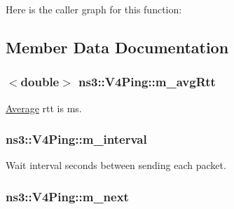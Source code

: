 Here is the caller graph for this function\+:




\subsection{Member Data Documentation}
\subsubsection[{\texorpdfstring{m\+\_\+avg\+Rtt}{m_avgRtt}}]{$<$double$>$ ns3\+::\+V4\+Ping\+::m\+\_\+avg\+Rtt\hspace{0.3cm}{\ttfamily [private]}}\hypertarget{classns3_1_1V4Ping_a03550e3b807e5fe961c2289749a45ba9}{}\label{classns3_1_1V4Ping_a03550e3b807e5fe961c2289749a45ba9}


\hyperlink{classns3_1_1Average}{Average} rtt is ms. 

\subsubsection[{\texorpdfstring{m\+\_\+interval}{m_interval}}]{ ns3\+::\+V4\+Ping\+::m\+\_\+interval\hspace{0.3cm}{\ttfamily [private]}}\hypertarget{classns3_1_1V4Ping_af709274c8ed4f886a1710d49c28bd5ea}{}\label{classns3_1_1V4Ping_af709274c8ed4f886a1710d49c28bd5ea}


Wait interval seconds between sending each packet. 

\subsubsection[{\texorpdfstring{m\+\_\+next}{m_next}}]{ ns3\+::\+V4\+Ping\+::m\+\_\+next\hspace{0.3cm}{\ttfamily [private]}}\hypertarget{classns3_1_1V4Ping_a1367294031cf873b968ede49360fda7b}{}\label{classns3_1_1V4Ping_a1367294031cf873b968ede49360fda7b}


